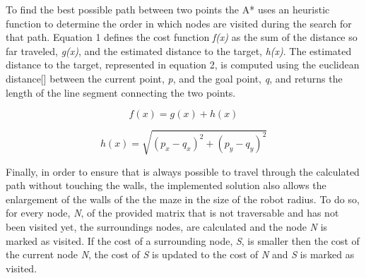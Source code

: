 \documentclass[oribibl]{llncs}
\begin{document}
To find the best possible path between two points the A* uses an heuristic function to determine the order in which nodes are visited during the search for that path. Equation 1 defines the cost function \textit{f(x)} as the sum of the distance so far traveled, \textit{g(x)}, and the estimated distance to the target, \textit{h(x)}. The estimated distance to the target, represented in equation 2, is computed using the euclidean distance[] between the current point, \textit{p}, and the goal point, \textit{q}, and returns the length of the line segment connecting the two points.

\begin{equation}
f(x) = g(x) + h(x)
\end{equation}

\begin{equation}
h(x) = \sqrt{(p_x - q_x)^2 + (p_y - q_y)^2}
\end{equation}

Finally, in order to ensure that is always possible to travel through the calculated path without touching the walls, the implemented solution also allows the enlargement of the walls of the the maze in the size of the robot radius. To do so, for every node, \textit{N}, of the provided matrix that is not traversable and has not been visited yet, the surroundings nodes, are calculated and the node \textit{N} is marked as visited. If the cost of a surrounding node, \textit{S}, is smaller then the cost of the current node \textit{N}, the cost of \textit{S} is updated to the cost of \textit{N} and \textit{S} is marked as visited.
\end{document}
